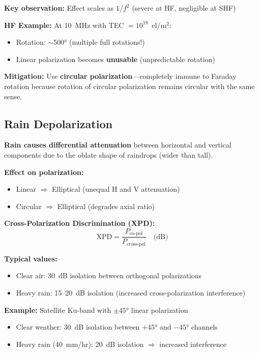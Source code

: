 \begin{center}
\textbf{Key observation:} Effect scales as $1/f^2$ (severe at HF, negligible at SHF)

\begin{warningbox}
\textbf{HF Example:} At 10~MHz with TEC $= 10^{18}$~el/m$^2$:
\begin{itemize}
\item Rotation: $\sim 500°$ (multiple full rotations!)
\item Linear polarization becomes \textbf{unusable} (unpredictable rotation)
\end{itemize}
\end{warningbox}

\textbf{Mitigation:} Use \textbf{circular polarization}---completely immune to Faraday rotation because rotation of circular polarization remains circular with the same sense.

\subsection{Rain Depolarization}

\textbf{Rain causes differential attenuation} between horizontal and vertical components due to the oblate shape of raindrops (wider than tall).

\textbf{Effect on polarization:}
\begin{itemize}
\item Linear $\Rightarrow$ Elliptical (unequal H and V attenuation)
\item Circular $\Rightarrow$ Elliptical (degrades axial ratio)
\end{itemize}

\textbf{Cross-Polarization Discrimination (XPD):}
\begin{equation}
\mathrm{XPD} = \frac{P_{\text{co-pol}}}{P_{\text{cross-pol}}} \quad \text{(dB)}
\label{eq:xpd}
\end{equation}

\textbf{Typical values:}
\begin{itemize}
\item Clear air: 30~dB isolation between orthogonal polarizations
\item Heavy rain: 15--20~dB isolation (increased cross-polarization interference)
\end{itemize}

\textbf{Example:} Satellite Ku-band with $\pm 45°$ linear polarization
\begin{itemize}
\item Clear weather: 30~dB isolation between $+45°$ and $-45°$ channels
\item Heavy rain (40~mm/hr): 20~dB isolation $\Rightarrow$ increased interference
\end{itemize}


\end{center}
